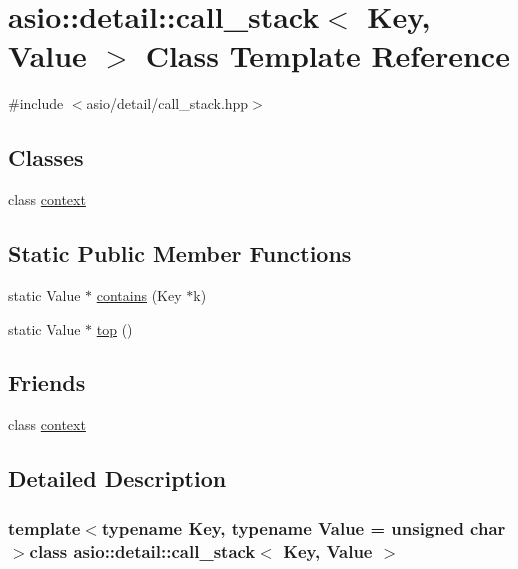 \hypertarget{classasio_1_1detail_1_1call__stack}{}\section{asio\+:\+:detail\+:\+:call\+\_\+stack$<$ Key, Value $>$ Class Template Reference}
\label{classasio_1_1detail_1_1call__stack}


{\ttfamily \#include $<$asio/detail/call\+\_\+stack.\+hpp$>$}

\subsection*{Classes}
\begin{DoxyCompactItemize}
\item 
class \hyperlink{classasio_1_1detail_1_1call__stack_1_1context}{context}
\end{DoxyCompactItemize}
\subsection*{Static Public Member Functions}
\begin{DoxyCompactItemize}
\item 
static Value $\ast$ \hyperlink{classasio_1_1detail_1_1call__stack_a615354f312e7a38e5eca82a4d59e7950}{contains} (Key $\ast$k)
\item 
static Value $\ast$ \hyperlink{classasio_1_1detail_1_1call__stack_a606704e47633b7b0bcf0d46fc636429f}{top} ()
\end{DoxyCompactItemize}
\subsection*{Friends}
\begin{DoxyCompactItemize}
\item 
class \hyperlink{classasio_1_1detail_1_1call__stack_ac78d499d6bdacfe4cc1f67b4ce865513}{context}
\end{DoxyCompactItemize}


\subsection{Detailed Description}
\subsubsection*{template$<$typename Key, typename Value = unsigned char$>$class asio\+::detail\+::call\+\_\+stack$<$ Key, Value $>$}



